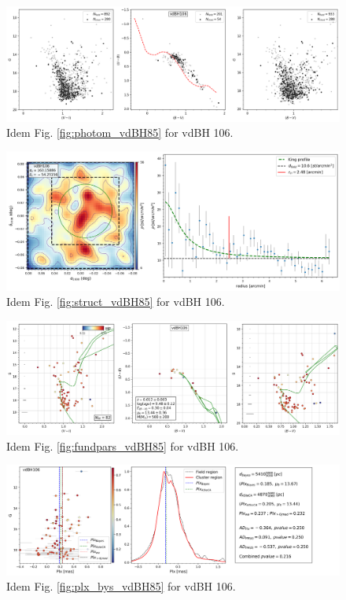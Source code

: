 \documentclass[referee]{aa}
\begin{document}
\begin{figure}[ht]
    \centering
    \includegraphics[width=\hsize]{../figs/obs_vdBH106.png}
    \caption{Idem Fig. \ref{fig:photom_vdBH85} for vdBH 106.}
    \label{fig43}
\end{figure}
\begin{figure}[ht]
    \centering
    \includegraphics[width=\hsize]{../figs/dmap_vdbh106.png}
    \caption{Idem Fig. \ref{fig:struct_vdBH85} for vdBH 106.}
    \label{fig44}
\end{figure}
\begin{figure}[ht]
    \centering
    \includegraphics[width=\hsize]{../figs/cmds_vdbh106.png}
    \caption{Idem Fig. \ref{fig:fundpars_vdBH85} for vdBH 106.}
    \label{fig45}
\end{figure}
\begin{figure}[ht]
    \centering
    \includegraphics[width=\hsize]{../figs/plx_vdBH106.png}
    \caption{Idem Fig. \ref{fig:plx_bys_vdBH85} for vdBH 106.}
    \label{fig46}
\end{figure}
\end{document}
